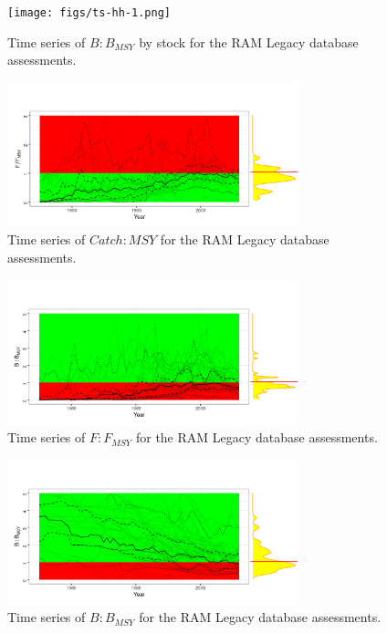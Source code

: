 \begin{figure}[ht!]
\centering
\texttt{[image: figs/ts-hh-1.png]}
\caption{Time series of $B:B_{MSY}$ by stock for the RAM Legacy database assessments.}
\label{fig:ts}
\end{figure}

\begin{figure}[ht!]
\centering
\includegraphics[width=0.75\textwidth]{figs/ts-c-1.png}
\caption{Time series of $Catch:MSY$ for the RAM Legacy database assessments.}
\label{fig:ts-c}
\end{figure}


\begin{figure}[ht!]
\centering
\includegraphics[width=0.75\textwidth]{figs/ts-f-1.png}
\caption{Time series of $F:F_{MSY}$ for the RAM Legacy database assessments.}
\label{fig:ts-f}
\end{figure}

\begin{figure}[ht!]
\centering
\includegraphics[width=0.75\textwidth]{figs/ts-ssb-1.png}
\caption{Time series of $B:B_{MSY}$ for the RAM Legacy database assessments.}
\label{fig:ts-s}
\end{figure}


